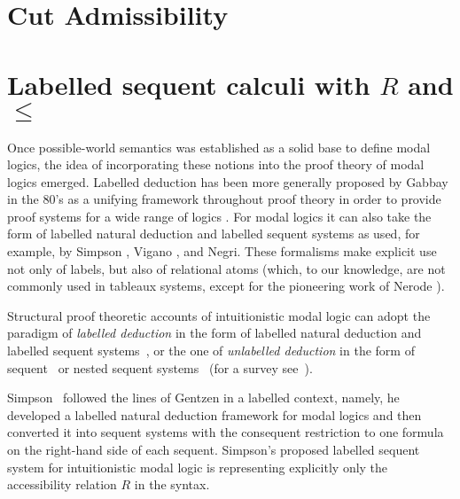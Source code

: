 \documentclass[a4paper]{article}
\theoremstyle{plain}
\theoremstyle{definition}
\newcommand{\B}{\mathcal{R}}
\newcommand*{\fm}[1]{{\color{notgreen}{#1}}}
\newcommand*{\lb}[1]{{\color{blue}{#1}}}
\newcommand*{\labels}[2]{\lb{#1}\mathord{:}\fm{#2}}
\newcommand{\SEQ}{\Longrightarrow}
\newcommand*{\rel}{R}
\begin{document}
\section{Cut Admissibility}\label{sec:cut-elim}



\section{Labelled sequent calculi with $\rel$ and $\le$}


Once possible-world semantics was established as a solid base to define modal logics, the idea of incorporating these notions into the proof theory of modal logics emerged.  Labelled deduction has been more generally proposed by Gabbay in the 80's as a unifying framework throughout proof theory in order to provide proof systems for a wide range of logics \cite{gabbay:96}. For modal logics it can also take the form of labelled natural deduction and labelled sequent systems as used, for example, by Simpson \cite{simpson:phd}, Vigano \cite{vigano:00}, and Negri\cite{negri:jpl2005}. These formalisms make explicit use not only of labels, but also of relational atoms (which, to our knowledge, are not commonly used in tableaux systems, except for the pioneering work of Nerode \cite{nerode:91}).

Structural proof theoretic accounts of intuitionistic modal logic can adopt the paradigm of \emph{labelled deduction} in the form of labelled natural deduction and labelled sequent systems~\cite{simpson:phd}, or the one of \emph{unlabelled deduction} in the form of sequent~\cite{Bierman} or nested sequent systems~\cite{strassburger:fossacs13} (for a survey see~\cite[Chap.~3]{Marin}).

Simpson~\cite{simpson:phd} followed the lines of Gentzen in a labelled context, namely, he developed a labelled natural deduction framework for modal logics and then converted it into sequent systems with the consequent restriction to one formula on the right-hand side of each sequent. Simpson's proposed labelled sequent system for intuitionistic modal logic is representing explicitly only the accessibility relation $\rel$ in the syntax.
%
\end{document}

